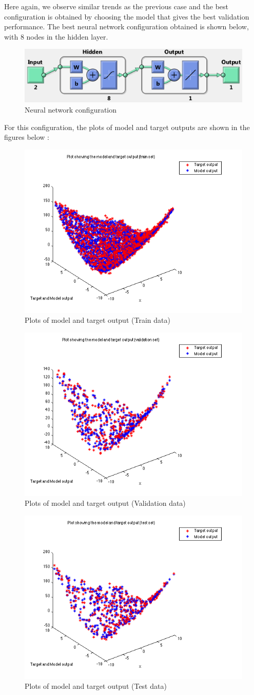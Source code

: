 Here again, we observe similar trends as the previous case and the best configuration is obtained by choosing the model that gives the best validation performance.
The best neural network configuration obtained is shown below, with 8 nodes in the hidden layer.

\begin{figure}[H]
\centering
\includegraphics[width=0.6\linewidth]{Regression/bivariate/net_config.png}
\caption{Neural network configuration}
\end{figure}

For this configuration, the plots of model and target outputs are shown in the figures below : 

\begin{figure}[H]
\centering
\includegraphics[width=0.5\linewidth]{Regression/bivariate/output_1layer_train.png}
\caption{Plots of model and target output (Train data)}
\end{figure}

\begin{figure}[H]
\centering
\includegraphics[width=0.5\linewidth]{Regression/bivariate/output_1layer_val.png}
\caption{Plots of model and target output (Validation data)}
\end{figure}

\begin{figure}[H]
\centering
\includegraphics[width=0.5\linewidth]{Regression/bivariate/output_1layer_test.png}
\caption{Plots of model and target output (Test data)}
\end{figure}

